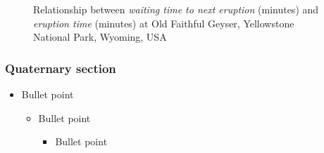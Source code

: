 \documentclass[
12pt,
openright,
oneside,
a4paper,
chapter=TITLE,
section=TITLE,
french,
spanish,
brazil,
english
]{abntex2}\usepackage{array}
\theoremstyle{plain}
\theoremstyle{remark}
\begin{document}
\begin{figure}[H]

\caption{\label{fig-eruption}Relationship between \emph{waiting time to
next eruption} (minutes) and \emph{eruption time} (minutes) at Old
Faithful Geyser, Yellowstone National Park, Wyoming, USA}


\end{figure}%

\clearpage

\subsubsection{Quaternary section}\label{quaternary-section}

\begin{itemize}
\tightlist
\item
  Bullet point

  \begin{itemize}
  \tightlist
  \item
    Bullet point

    \begin{itemize}
    \tightlist
    \item
      Bullet point
    \end{itemize}
  \end{itemize}
\end{itemize}
\end{document}
